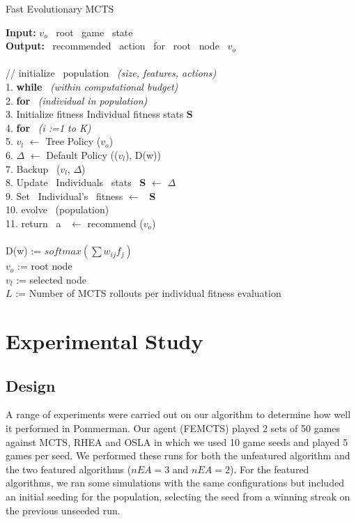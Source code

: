 \documentclass{llncs}
\newcommand\tab[1][1cm]{\hspace*{#1}}
\begin{document}
\begin{algorithm}
\caption{Fast Evolutionary MCTS}
\label{Algo}

\textbf{Input:} $v_{o}$ \ root \ game \ state \\ 
\textbf{Output:} \ recommended \ action \ for \ root \ node  \ $v_{o}$ \\ \\ 
// initialize \ population \ \emph{(size, features, actions)} \\ 
1. \textbf{while} \ \emph{(within computational budget)} \\
2. \tab \textbf{for} \ \emph{(individual in population)} \\ 
3. \tab Initialize fitness Individual fitness stats \textbf{S} \\
4. \tab \tab \textbf{for} \ \emph{(i :=1 to K)} \\
5. \tab \tab \tab $v_{l}$ $\longleftarrow$ Tree Policy ($v_{o}$) \\
6. \tab \tab \tab $\Delta$ $\longleftarrow$ Default Policy (($v_{l}$), D(w)) \\
7. \tab \tab \tab Backup \ ($v_{l}$, $\Delta$) \\
8. \tab \tab \tab Update \ Individuals \ stats \ \textbf{S} $\longleftarrow$ $\Delta$ \\
9. \tab \tab Set \ Individual's \ fitness $\longleftarrow$ \ \textbf{S} \\
10. \tab evolve \ (population) \\
11. return \ a \  $\longleftarrow$ recommend ($v_{o}$) \\
\\
D(w) := $softmax(\sum{}{} w_{ij} f_{j})$ \\
$v_{o}$ := root node \\ 
$v_{l}$ := selected node \\
$L$ := Number of MCTS rollouts per individual fitness evaluation \\

\end{algorithm}



\section{Experimental Study} \label{sec:exp}

\subsection{Design}
A range of experiments were carried out on our algorithm to determine how well it performed in Pommerman. Our agent (FEMCTS) played 2 sets of 50 games against MCTS, RHEA and OSLA in which we used 10 game seeds and played 5 games per seed. We performed these runs for both the unfeatured algorithm and the two featured algorithms ($nEA = 3$ and $nEA = 2$). For the featured algorithms, we ran some simulations with the same configurations but included an initial seeding for the population, selecting the seed from a winning streak on the previous unseeded run.
\end{document}
